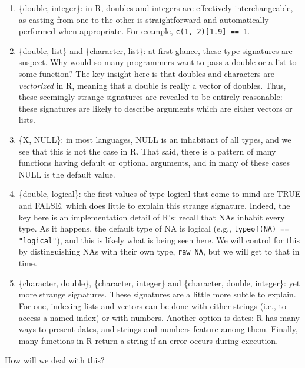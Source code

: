\documentclass[acmsmall,10pt,review,anonymous]{acmart}\settopmatter{printfolios=true,printccs=false,printacmref=false}
\newcommand{\code}[1]{\lstinline|#1|\xspace}
\begin{document}
\begin{enumerate}

	\item \{double, integer\}: in R, doubles and integers are effectively interchangeable, as casting from one to the other is straightforward and automatically performed when appropriate.
	For example, \code{c(1, 2)[1.9] == 1}.
	
	\item \{double, list\} and \{character, list\}: at first glance, these type signatures are suspect.
	Why would so many programmers want to pass a double or a list to some function?
	The key insight here is that doubles and characters are {\it vectorized} in R, meaning that a double is really a vector of doubles.
	Thus, these seemingly strange signatures are revealed to be entirely reasonable: these signatures are likely to describe arguments which are either vectors or lists.
	
	\item \{X, NULL\}: in most languages, NULL is an inhabitant of all types, and we see that this is not the case in R.
	That said, there is a pattern of many functions having default or optional arguments, and in many of these cases NULL is the default value.
	
	\item \{double, logical\}: the first values of type logical that come to mind are TRUE and FALSE, which does little to explain this strange signature.
	Indeed, the key here is an implementation detail of R's: recall that NAs inhabit every type.
	As it happens, the default type of NA is logical (e.g., \code{typeof(NA) == "logical"}), and this is likely what is being seen here.
	We will control for this by distinguishing NAs with their own type, {\tt raw\_NA}, but we will get to that in time.
	
	\item \{character, double\}, \{character, integer\} and \{character, double, integer\}: yet more strange signatures.
	These signatures are a little more subtle to explain.
	For one, indexing lists and vectors can be done with either strings (i.e., to access a named index) or with numbers.
	Another option is dates: R has many ways to present dates, and strings and numbers feature among them.
	Finally, many  functions in R return a string if an error occurs during execution.

\end{enumerate}

How will we deal with this?
\end{document}
